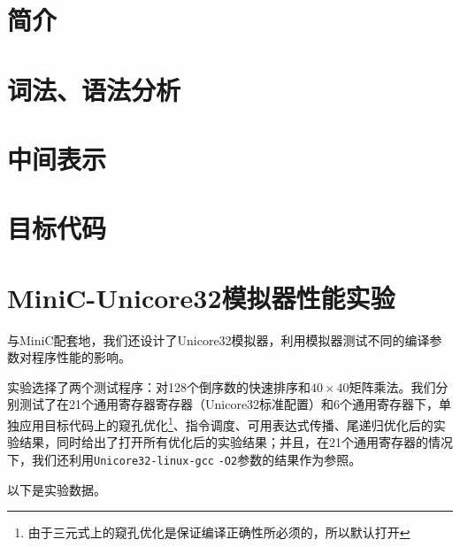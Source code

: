 

%

\tableofcontents
\chapter*{简介}

\chapter{词法、语法分析}
\label{flexbison}

\chapter{中间表示}
\label{intermidiate}

\chapter{目标代码}
\label{targetcode}


%
%
\chapter{MiniC-Unicore32模拟器性能实验}
\label{joint}
与MiniC配套地，我们还设计了Unicore32模拟器，利用模拟器测试不同的编译参数对程序性能的影响。

实验选择了两个测试程序：对128个倒序数的快速排序和$40\times 40$矩阵乘法。我们分别测试了在21个通用寄存器寄存器（Unicore32标准配置）和6个通用寄存器下，单独应用目标代码上的窥孔优化\footnote{由于三元式上的窥孔优化是保证编译正确性所必须的，所以默认打开}、指令调度、可用表达式传播、尾递归优化后的实验结果，同时给出了打开所有优化后的实验结果；并且，在21个通用寄存器的情况下，我们还利用\verb|Unicore32-linux-gcc| \verb|-O2|参数的结果作为参照。

以下是实验数据。
